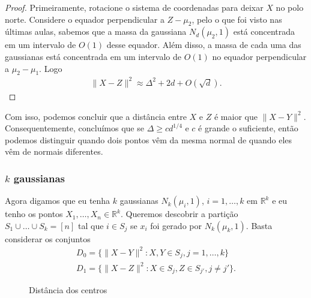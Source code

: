\begin{proof}

  Primeiramente, rotacione o sistema de coordenadas para deixar $X$ no
  polo norte. Considere o equador perpendicular a $Z-\mu_{2}$, pelo o
  que foi visto nas últimas aulas, sabemos que a massa da gaussiana
  $N_{d}(\mu_{2},1)$ está concentrada em um intervalo de $O(1)$ desse
  equador. Além disso, a massa de cada uma das gaussianas está
  concentrada em um intervalo de $O(1)$ no equador perpendicular a
  $\mu_{2}-\mu_{1}$. Logo
  \begin{align*}
    \lVert X - Z \rVert^{2} \approx \Delta^{2}+2d+O(\sqrt{d}).
  \end{align*}
\end{proof}

Com isso, podemos concluir que a distância entre $X$ e $Z$ é maior que
$\lVert X - Y \rVert^{2}$. Consequentemente, concluímos que se
$\Delta \geq cd^{1/4}$ e $c$ é grande o suficiente, então podemos
distinguir quando dois pontos vêm da mesma normal de quando eles vêm
de normais diferentes.

\subsubsection{$k$ gaussianas}

Agora digamos que eu tenha $k$ gaussianas $N_{k}(\mu_{i},1)$,
$i=1,\dots,k$ em $\mathbb{R}^{k}$ e eu tenho os pontos
$X_{1},\dots,X_{n} \in \mathbb{R}^{k}$. Queremos descobrir a partição
$S_{1} \cup \dots \cup S_{k} = [n]$ tal que $i \in S_{j}$ se $x_{i}$
foi gerado por $N_{k}(\mu_{k}, 1)$. Basta considerar os conjuntos
\begin{align*}
  D_{0} = \{ \lVert X - Y \rVert^{2} : X,Y \in S_{j}, j=1,\dots,k\}\\
  D_{1} = \{ \lVert X - Z \rVert^{2} : X \in S_{j}, Z \in S_{j'}, j \neq j'\}.
\end{align*}


\begin{figure}
  \caption{Distância dos centros}
  \label{fig:dist_centros}
\end{figure}

